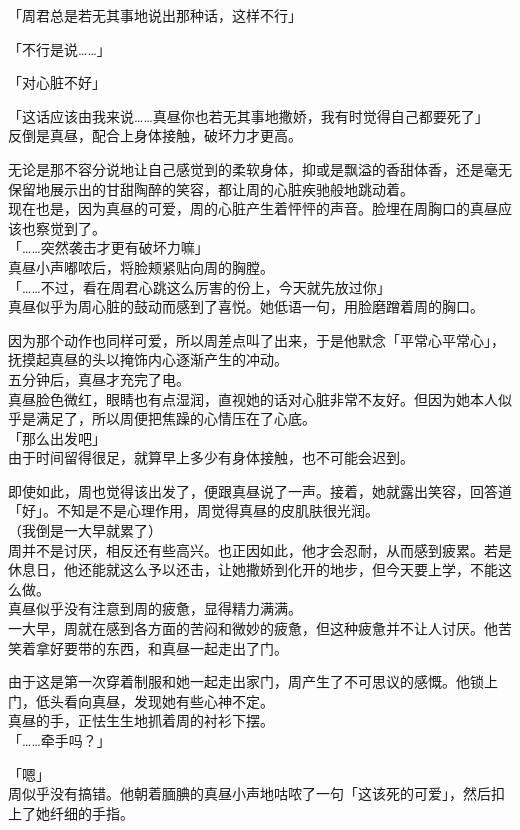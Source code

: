 「周君总是若无其事地说出那种话，这样不行」

「不行是说……」

「对心脏不好」

「这话应该由我来说……真昼你也若无其事地撒娇，我有时觉得自己都要死了」\\

反倒是真昼，配合上身体接触，破坏力才更高。

无论是那不容分说地让自己感觉到的柔软身体，抑或是飘溢的香甜体香，还是毫无保留地展示出的甘甜陶醉的笑容，都让周的心脏疾驰般地跳动着。\\

现在也是，因为真昼的可爱，周的心脏产生着怦怦的声音。脸埋在周胸口的真昼应该也察觉到了。\\

「……突然袭击才更有破坏力嘛」\\

真昼小声嘟哝后，将脸颊紧贴向周的胸膛。\\

「……不过，看在周君心跳这么厉害的份上，今天就先放过你」\\

真昼似乎为周心脏的鼓动而感到了喜悦。她低语一句，用脸磨蹭着周的胸口。

因为那个动作也同样可爱，所以周差点叫了出来，于是他默念「平常心平常心」，抚摸起真昼的头以掩饰内心逐渐产生的冲动。\\

五分钟后，真昼才充完了电。\\

真昼脸色微红，眼睛也有点湿润，直视她的话对心脏非常不友好。但因为她本人似乎是满足了，所以周便把焦躁的心情压在了心底。\\

「那么出发吧」\\

由于时间留得很足，就算早上多少有身体接触，也不可能会迟到。

即使如此，周也觉得该出发了，便跟真昼说了一声。接着，她就露出笑容，回答道「好」。不知是不是心理作用，周觉得真昼的皮肌肤很光润。\\

（我倒是一大早就累了）\\

周并不是讨厌，相反还有些高兴。也正因如此，他才会忍耐，从而感到疲累。若是休息日，他还能就这么予以还击，让她撒娇到化开的地步，但今天要上学，不能这么做。\\

真昼似乎没有注意到周的疲惫，显得精力满满。\\

一大早，周就在感到各方面的苦闷和微妙的疲惫，但这种疲惫并不让人讨厌。他苦笑着拿好要带的东西，和真昼一起走出了门。

由于这是第一次穿着制服和她一起走出家门，周产生了不可思议的感慨。他锁上门，低头看向真昼，发现她有些心神不定。\\

真昼的手，正怯生生地抓着周的衬衫下摆。\\

「……牵手吗？」

「嗯」\\

周似乎没有搞错。他朝着腼腆的真昼小声地咕哝了一句「这该死的可爱」，然后扣上了她纤细的手指。
